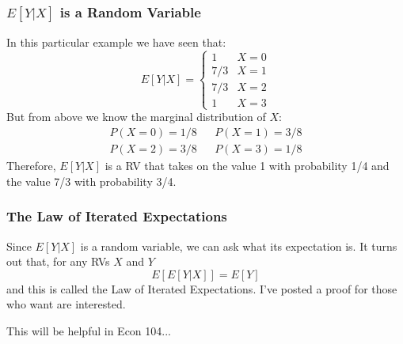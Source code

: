 \documentclass[handout]{beamer}
\begin{document}
\begin{frame}
\frametitle{$E[Y|X]$ is a Random Variable}
In this particular example we have seen that:
	$$E[Y|X]= \left\{\begin{array}{cc}  
	1& X = 0\\
	7/3& X = 1\\
	7/3& X = 2\\ 
	1& X = 3 
	\end{array}\right.$$ 
But from above we know the marginal distribution of $X:$
	\begin{eqnarray*}
		P(X=0)= 1/8 && P(X=1) = 3/8\\
		P(X=2)=3/8 && P(X=3)=1/8
	\end{eqnarray*} \pause
\alert{Therefore, $E[Y|X]$ is a RV that takes on the value 1 with probability 1/4 and the value 7/3 with probability 3/4.}

\end{frame}
\begin{frame}
\frametitle{The Law of Iterated Expectations}
Since $E[Y|X]$ is a random variable, we can ask what its expectation is. It turns out that, for any RVs $X$ and $Y$
	$$\boxed{E\left[E\left[Y|X  \right]  \right] = E[Y]}$$
and this is called the \alert{Law of Iterated Expectations}. I've posted a proof \textcolor{blue}{\href{http://fditraglia.github.io/Econ103Public/IteratedExpectationsProof.pdf}{}} for those who want are interested.


\vspace{2em}
\hfill This will be helpful in Econ 104...
\end{frame}
\end{document}
